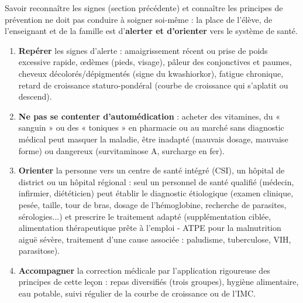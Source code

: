 \documentclass[11pt]{article}
\begin{document}
Savoir reconnaître les signes (section précédente) et connaître les principes de prévention ne doit pas conduire à soigner soi-même : la place de l'élève, de l'enseignant et de la famille est d'\textbf{alerter et d'orienter} vers le système de santé.

\begin{methode}
\begin{enumerate}
\item \textbf{Repérer} les signes d'alerte : amaigrissement récent ou prise de poids excessive rapide, œdèmes (pieds, visage), pâleur des conjonctives et paumes, cheveux décolorés/dépigmentés (signe du kwashiorkor), fatigue chronique, retard de croissance staturo-pondéral (courbe de croissance qui s'aplatit ou descend).
\item \textbf{Ne pas se contenter d'automédication} : acheter des vitamines, du « sanguin » ou des « toniques » en pharmacie ou au marché sans diagnostic médical peut masquer la maladie, être inadapté (mauvais dosage, mauvaise forme) ou dangereux (survitaminose A, surcharge en fer).
\item \textbf{Orienter} la personne vers un centre de santé intégré (CSI), un hôpital de district ou un hôpital régional : seul un personnel de santé qualifié (médecin, infirmier, diététicien) peut établir le diagnostic étiologique (examen clinique, pesée, taille, tour de bras, dosage de l'hémoglobine, recherche de parasites, sérologies...) et prescrire le traitement adapté (supplémentation ciblée, alimentation thérapeutique prête à l'emploi - ATPE pour la malnutrition aiguë sévère, traitement d'une cause associée : paludisme, tuberculose, VIH, parasitose).
\item \textbf{Accompagner} la correction médicale par l'application rigoureuse des principes de cette leçon : repas diversifiés (trois groupes), hygiène alimentaire, eau potable, suivi régulier de la courbe de croissance ou de l'IMC.
\end{enumerate}
\end{methode}
\end{document}
